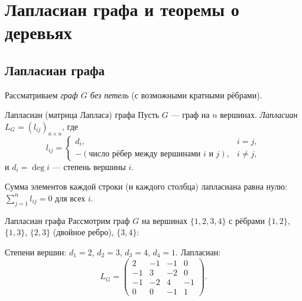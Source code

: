 
\section{Лапласиан графа и теоремы о деревьях}

\subsection{Лапласиан графа}

Рассматриваем \emph{граф $G$ без петель} (с возможными кратными рёбрами).

\begin{Definition}{Лапласиан (матрица Лапласа) графа}{}
	Пусть $G$ — граф на $n$ вершинах. \emph{Лапласиан} $L_G = (l_{ij})_{n\times n}$, где
	\[
	l_{ij} =
	\begin{cases}
		d_i, & i = j,\\
		-(\text{число рёбер между вершинами } i \text{ и } j), & i \neq j,
	\end{cases}
	\]
	и $d_i = \deg i$ — степень вершины $i$.
\end{Definition}

\begin{Remark}{}{}
	Сумма элементов каждой строки (и каждого столбца) лапласиана равна нулю:
	$\displaystyle\sum_{j=1}^{n} l_{ij} = 0$ для всех $i$.
\end{Remark}

\begin{Example}{Лапласиан графа}{}
	Рассмотрим граф $G$ на вершинах $\{1,2,3,4\}$ с рёбрами
	$\{1,2\}$, $\{1,3\}$, $\{2,3\}$ (двойное ребро), $\{3,4\}$:
	
	\begin{center}
	\end{center}
	
	Степени вершин: $d_1=2$, $d_2=3$, $d_3=4$, $d_4=1$. Лапласиан:
	\[
	L_G =
	\begin{pmatrix}
		2 & -1 & -1 &  0 \\
		-1 &  3 & -2 &  0 \\
		-1 & -2 &  4 & -1 \\
		0 &  0 & -1 &  1
	\end{pmatrix}.
	\]
\end{Example}

